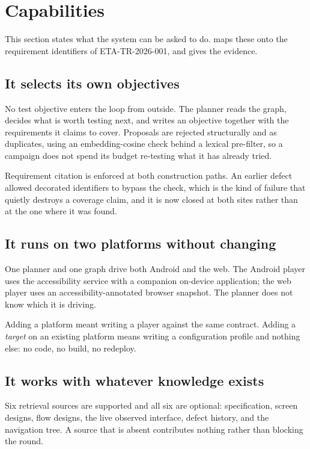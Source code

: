 \section{Capabilities}
\label{sec:capabilities}

This section states what the system can be asked to do. 
maps these onto the requirement identifiers of ETA-TR-2026-001, and
 gives the evidence.

\subsection{It selects its own objectives}

No test objective enters the loop from outside. The planner reads the graph,
decides what is worth testing next, and writes an objective together with the
requirements it claims to cover. Proposals are rejected structurally and as
duplicates, using an embedding-cosine check behind a lexical pre-filter, so a
campaign does not spend its budget re-testing what it has already tried.

Requirement citation is enforced at both construction paths. An earlier defect
allowed decorated identifiers to bypass the check, which is the kind of failure
that quietly destroys a coverage claim, and it is now closed at both sites
rather than at the one where it was found.

\subsection{It runs on two platforms without changing}

One planner and one graph drive both Android and the web. The Android player
uses the accessibility service with a companion on-device application; the web
player uses an accessibility-annotated browser snapshot. The planner does not
know which it is driving.

Adding a platform meant writing a player against the same contract. Adding a
\emph{target} on an existing platform means writing a configuration profile and
nothing else: no code, no build, no redeploy.

\subsection{It works with whatever knowledge exists}

Six retrieval sources are supported and all six are optional: specification,
screen designs, flow designs, the live observed interface, defect history, and
the navigation tree. A source that is absent contributes nothing rather than
blocking the round.

